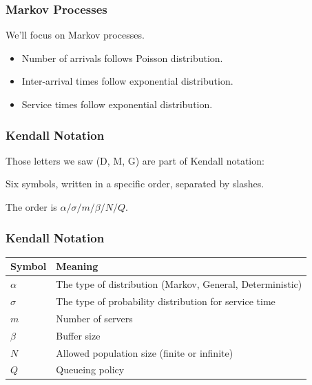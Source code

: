 \begin{frame}
\frametitle{Markov Processes}

\large
\begin{changemargin}{1.5cm}
We'll focus on Markov processes. 
~\\[0em]
\begin{itemize}
\item Number of arrivals follows Poisson distribution.

\item Inter-arrival times follow exponential distribution. 

\item Service times follow exponential distribution.
\end{itemize}
\end{changemargin}

\end{frame}



\begin{frame}
\frametitle{Kendall Notation}

\Large
\begin{changemargin}{1.5cm}
Those letters we saw (D, M, G) are part of Kendall notation:

Six symbols, written in a specific order, separated by slashes. 

The order is $\alpha / \sigma / m / \beta / N / Q$. 
\end{changemargin}

\end{frame}



\begin{frame}
\frametitle{Kendall Notation}

\begin{center}
\begin{tabular}{ll} 
	\textbf{Symbol} & \textbf{Meaning} \\ \hline
	$\alpha$ & The type of distribution (Markov, General, Deterministic) \\ 
	$\sigma$ & The type of probability distribution for service time \\ 
	$m$ & Number of servers \\ 
	$\beta$ & Buffer size \\ 
	$N$ & Allowed population size (finite or infinite) \\ 
	$Q$ & Queueing policy \\ 
\end{tabular}
\end{center}

\end{frame}



